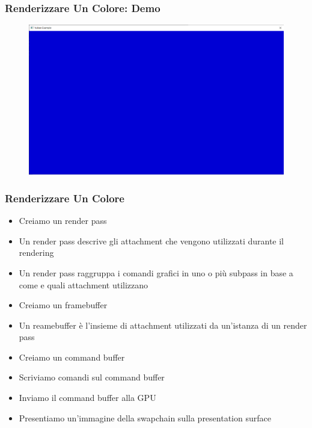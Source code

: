 \begin{frame}
\frametitle{Renderizzare Un Colore: Demo}
\begin{figure}[ht]
    \centering
    \includegraphics[scale=0.25]{images/SlidesClearWindow/ClearWindow.png}
\end{figure}
\end{frame}

\begin{frame}
\frametitle{Renderizzare Un Colore}

\begin{itemize}
\item Creiamo un render pass
\item Un render pass descrive gli attachment che vengono utilizzati durante il rendering
\item Un render pass raggruppa i comandi grafici in uno o più subpass in base a come e quali attachment utilizzano
\item Creiamo un framebuffer
\item Un reamebuffer è l'insieme di attachment utilizzati da un'istanza di un render pass
\item Creiamo un command buffer
\item Scriviamo comandi sul command buffer
\item Inviamo il command buffer alla GPU
\item Presentiamo un'immagine della swapchain sulla presentation surface
\end{itemize}
\end{frame}

